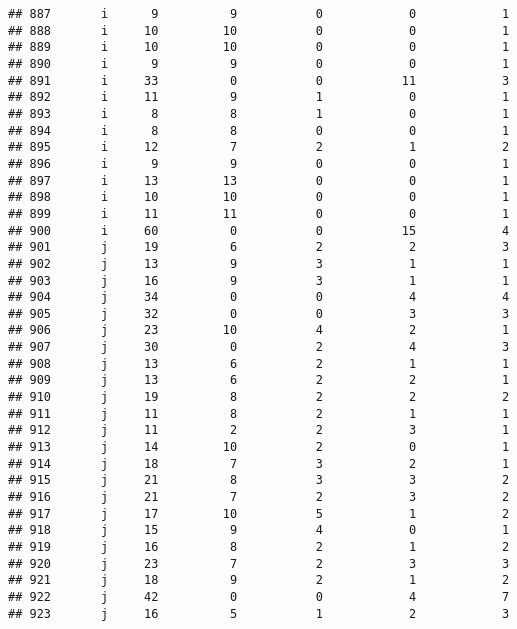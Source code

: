 \documentclass[
]{article}
\begin{document}
\begin{verbatim}
## 887       i      9          9           0            0            1
## 888       i     10         10           0            0            1
## 889       i     10         10           0            0            1
## 890       i      9          9           0            0            1
## 891       i     33          0           0           11            3
## 892       i     11          9           1            0            1
## 893       i      8          8           1            0            1
## 894       i      8          8           0            0            1
## 895       i     12          7           2            1            2
## 896       i      9          9           0            0            1
## 897       i     13         13           0            0            1
## 898       i     10         10           0            0            1
## 899       i     11         11           0            0            1
## 900       i     60          0           0           15            4
## 901       j     19          6           2            2            3
## 902       j     13          9           3            1            1
## 903       j     16          9           3            1            1
## 904       j     34          0           0            4            4
## 905       j     32          0           0            3            3
## 906       j     23         10           4            2            1
## 907       j     30          0           2            4            3
## 908       j     13          6           2            1            1
## 909       j     13          6           2            2            1
## 910       j     19          8           2            2            2
## 911       j     11          8           2            1            1
## 912       j     11          2           2            3            1
## 913       j     14         10           2            0            1
## 914       j     18          7           3            2            1
## 915       j     21          8           3            3            2
## 916       j     21          7           2            3            2
## 917       j     17         10           5            1            2
## 918       j     15          9           4            0            1
## 919       j     16          8           2            1            2
## 920       j     23          7           2            3            3
## 921       j     18          9           2            1            2
## 922       j     42          0           0            4            7
## 923       j     16          5           1            2            3

\end{verbatim}
\end{document}
